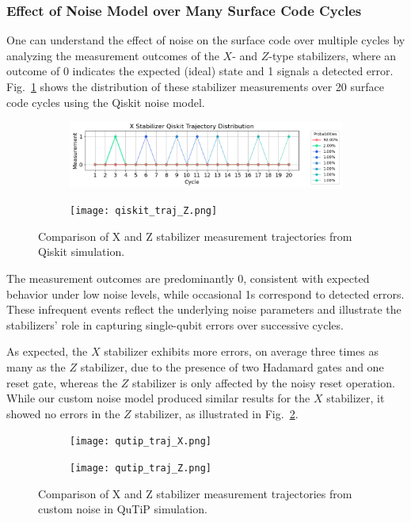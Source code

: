 \documentclass[9pt,a4paper,twocolumn,twoside]{tau-class/tau}
\begin{document}
\subsubsection*{Effect of Noise Model over Many Surface Code Cycles}
One can understand the effect of noise on the surface code over multiple cycles by analyzing the measurement outcomes of the \( X \)- and \( Z \)-type stabilizers, where an outcome of 0 indicates the expected (ideal) state and 1 signals a detected error. Fig.~\ref{fig:qiskit_traj_compare} shows the distribution of these stabilizer measurements over 20 surface code cycles using the Qiskit noise model.

\begin{figure}[H]
    \centering
    \begin{subfigure}[b]{\linewidth}
        \includegraphics[width=\linewidth]{figures/qiskit_traj_X.png}  
    \end{subfigure}
    \hfill
    \begin{subfigure}[b]{\linewidth}
        \texttt{[image: qiskit\_traj\_Z.png]}        
    \end{subfigure}
    \caption{Comparison of X and Z stabilizer measurement trajectories from Qiskit simulation.}
    \label{fig:qiskit_traj_compare}
\end{figure}

The measurement outcomes are predominantly 0, consistent with expected behavior under low noise levels, while occasional 1s correspond to detected errors. These infrequent events reflect the underlying noise parameters and illustrate the stabilizers' role in capturing single-qubit errors over successive cycles.

As expected, the \( X \) stabilizer exhibits more errors, on average three times as many as the \( Z \) stabilizer, due to the presence of two Hadamard gates and one reset gate, whereas the \( Z \) stabilizer is only affected by the noisy reset operation. While our custom noise model produced similar results for the \( X \) stabilizer, it showed no errors in the \( Z \) stabilizer, as illustrated in Fig.~\ref{fig:traj_compare}.

\begin{figure}[H]
    \begin{subfigure}[b]{\linewidth}
        \texttt{[image: qutip\_traj\_X.png]}
    \end{subfigure}
    \hfill
    \begin{subfigure}[b]{\linewidth}
        \texttt{[image: qutip\_traj\_Z.png]} 
    \end{subfigure}
    \caption{Comparison of X and Z stabilizer measurement trajectories from  custom noise in QuTiP simulation.}
    \label{fig:traj_compare}
\end{figure}
\end{document}
